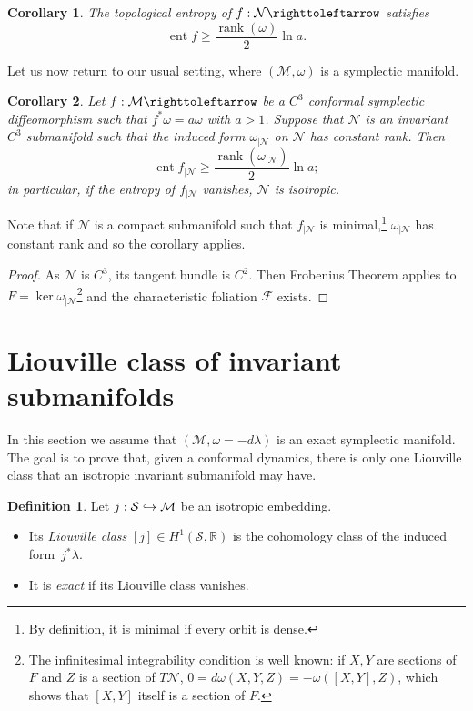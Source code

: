 \documentclass[JEP,XML,SOM,Unicode,published]{cedram}
\def\hto{\mathrel{\lhook\joinrel\to}}
\newtheorem{corollary}{Corollary}
\theoremstyle{definition}
\newtheorem{definition}[theorem]{Definition}
\def\R{\mathbb{R}}
\def\cF{{\mathcal F}}
\def\cM{{\mathcal M}}
\def\cN{{\mathcal N}}
\def\cS{{\mathcal S}}
\DeclareMathOperator{\ent}{ent}
\DeclareMathOperator\rank{rank}
\begin{document}
\begin{corollary}
\label{cor:ent}
The topological entropy of $f : \cN \righttoleftarrow$ satisfies
\[
\ent f \geq \frac{\rank (\omega)}{2} \ln a.
\]
\end{corollary}

Let us now return to our usual setting, where $(\cM,\omega)$ is a symplectic manifold.

\begin{corollary}\label{CCisoento}
Let $f:\cM\righttoleftarrow$ be a $C^3$ conformal symplectic diffeomorphism such that $f^*\omega=a\omega$ with $a>1$. Suppose that $\cN$ is an invariant $C^3$ submanifold such that the induced form $\omega_{\vert \cN}$ on $\cN$ has constant rank. Then
\[
\ent f_{\vert\cN} \geq \frac{\rank (\omega_{\vert \cN})}{2} \ln a;
\]
in particular, if the entropy of $f_{|\cN}$ vanishes, $\cN$ is isotropic.
\end{corollary}

Note that if $\cN$ is a compact submanifold such that $f_{|\cN}$ is minimal,\footnote{By definition, it is minimal if every orbit is dense.} $\omega_{|\cN}$ has constant rank and so the corollary applies.

\begin{proof}
As $\cN$ is $C^3$, its tangent bundle is $C^2$. Then Frobenius Theorem applies to $F = \ker \omega_{\vert \cN}$\footnote{The infinitesimal integrability condition is well known: if $X,Y$ are sections of $F$ and $Z$ is a section of $T\cN$, $0 = d\omega(X,Y,Z) = - \omega([X,Y],Z)$, which shows that $[X,Y]$ itself is a section of $F$.} and the characteristic foliation $\cF$ exists.
\end{proof}

\section{Liouville class of invariant submanifolds}
\label{SLiouville}
\label{sec:exactnessdiff}

In this section we assume that $(\cM,\omega={ -d\lambda})$ is an exact symplectic manifold. The goal is to prove that, given a conformal dynamics, there is only one Liouville class that an isotropic invariant submanifold may have.


\begin{definition}
Let $j : \cS \hto \cM$ be an isotropic embedding.
\begin{itemize}
\item
Its \emph{Liouville class} $[j] \in H^1(\cS,\R)$ is the cohomology class of the induced form~$j^*\lambda$.

\item
It is \emph{exact} if its Liouville class vanishes.
\end{itemize}
\end{definition}
\end{document}
